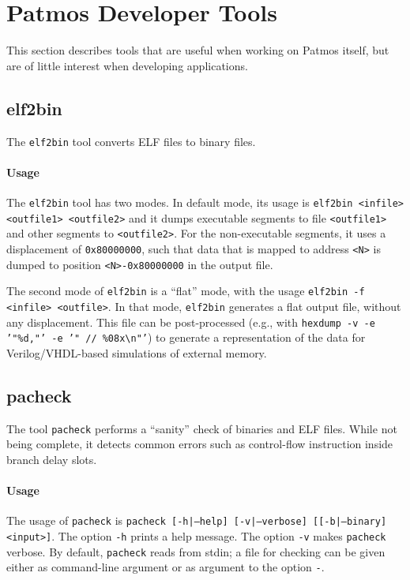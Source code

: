 \documentclass[a4paper,fontsize=10pt,twoside,DIV15,BCOR12mm,headinclude=true,footinclude=false,pagesize,bibtotoc]{scrbook}
\begin{document}
\section{Patmos Developer Tools}

This section describes tools that are useful when working on Patmos
itself, but are of little interest when developing applications.

\subsection{elf2bin}

The \texttt{elf2bin} tool converts ELF files to binary files.

\paragraph{Usage}

The \texttt{elf2bin} tool has two modes. In default mode, its usage is
\texttt{elf2bin <infile> <outfile1> <outfile2>} and it dumps
executable segments to file \texttt{<outfile1>} and other segments to
\texttt{<outfile2>}. For the non-executable segments, it uses a
displacement of \texttt{0x80000000}, such that data that is mapped to
address \texttt{<N>} is dumped to position \texttt{<N>-0x80000000} in
the output file.

The second mode of \texttt{elf2bin} is a ``flat'' mode, with the usage
\texttt{elf2bin -f <infile> <outfile>}. In that mode, \texttt{elf2bin}
generates a flat output file, without any displacement. This file can
be post-processed (e.g., with \texttt{hexdump -v -e '"\%d,"' -e '" // \%08x\textbackslash n"'})
to generate a representation of the data for Verilog/VHDL-based
simulations of external memory.

\subsection{pacheck}

The tool \texttt{pacheck} performs a ``sanity'' check of binaries and
ELF files. While not being complete, it detects common errors such as
control-flow instruction inside branch delay slots.

\paragraph{Usage}

The usage of \texttt{pacheck} is \texttt{pacheck [-h|---help]
  [-v|---verbose] [[-b|---binary] <input>]}. The option \texttt{-h}
prints a help message. The option \texttt{-v} makes \texttt{pacheck}
verbose. By default, \texttt{pacheck} reads from stdin; a file for
checking can be given either as command-line argument or as argument
to the option \texttt{-}.
\end{document}
